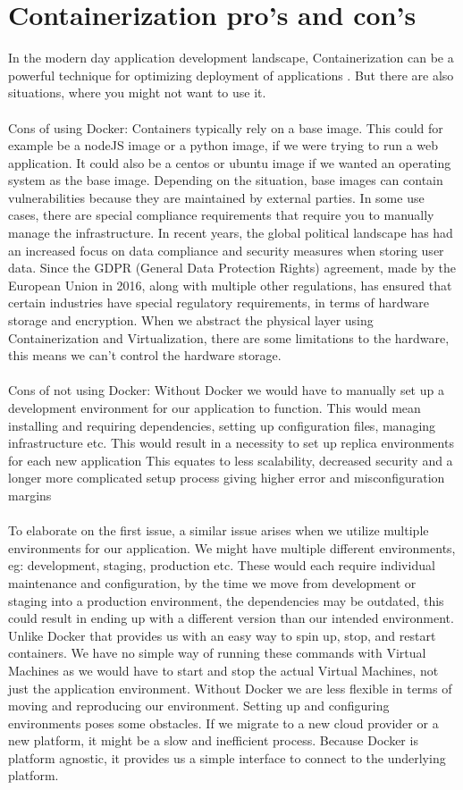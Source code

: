 \documentclass[a4paper,10pt]{article}
\begin{document}
	\section{Containerization pro’s and con’s}
	In the modern day application development landscape,
	Containerization can be a powerful technique for optimizing deployment of applications . But there are also situations, where you might not want to use it. \\\\
	Cons of using Docker:
	Containers typically rely on a base image. This could for example be a nodeJS image or a python image, if we were trying to run a web application. It could also be a centos or ubuntu image if we wanted an operating system as the base image. Depending on the situation, base images can contain vulnerabilities because they are maintained by external parties. 
	\cite{osti_1244917}
	In some use cases, there are special compliance requirements that require you to manually manage the infrastructure. In recent years, the global political landscape has had an increased focus on data compliance and security measures when storing user data. Since the GDPR (General Data Protection Rights) agreement, made by the European Union in 2016, along with multiple other regulations, has ensured that certain industries have special regulatory requirements, in terms of hardware storage and encryption. When we abstract the physical layer using Containerization and Virtualization, there are some limitations to the hardware, this means we can’t control the hardware storage. 
	\\\\
	Cons of not using Docker: 
	Without Docker we would have to manually set up a development environment for our application to function. This would mean installing and requiring dependencies, setting up configuration files, managing infrastructure etc. This would result in a necessity to set up replica environments for each new application This equates to less scalability, decreased security and a longer more complicated setup process giving higher error and misconfiguration margins\\\\
	To elaborate on the first issue, a similar issue arises when we utilize multiple environments for our application. We might have multiple different environments, eg: development, staging, production etc. These would each require individual maintenance and configuration, by the time we move from development or staging into a production environment, the dependencies may be outdated, this could result in ending up with a different version than our intended environment. 
	Unlike Docker that provides us with an easy way to spin up, stop, and restart containers. We have no simple way of running these commands with Virtual Machines as we would have to start and stop the actual Virtual Machines, not just the application environment. 
	Without Docker we are less flexible in terms of moving and reproducing our environment. Setting up and configuring environments poses some obstacles. If we migrate to a new cloud provider or a new platform, it might be a slow and inefficient process. Because Docker is platform agnostic, it provides us a simple interface to connect to the underlying platform. 
	
\end{document}
